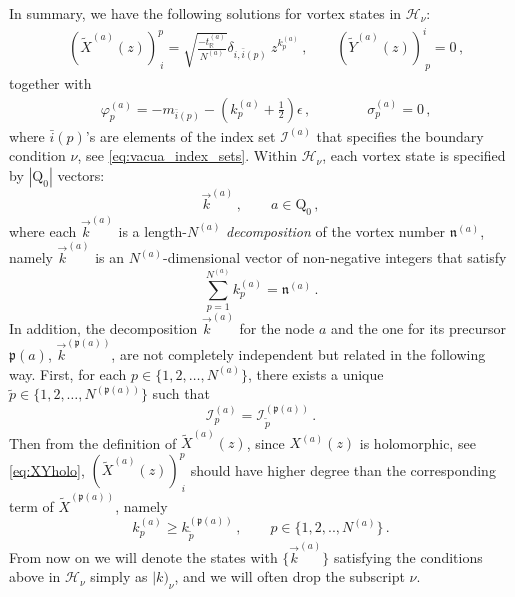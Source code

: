 \documentclass[12pt,a4paper]{article}
\newcommand{\nn}{\mathfrak{n}}
\renewcommand{\(}{\left(}
\renewcommand{\)}{\right)}
\renewcommand{\(}{\left(}
\renewcommand{\)}{\right)}
\begin{document}
\medskip

In summary, we have the following solutions for vortex states in $\mathcal{H}_\nu$:
\begin{equation}\label{eq:vortex_state}
\begin{aligned}
&\left(\tilde{X}^{(a)}(z)\right)^p_{\ i}=\sqrt{\frac{-t_{\mathbb{R}}^{(a)}}{N^{(a)}}} \delta_{i,\bar{i}(p)}\ z^{k^{(a)}_p}\,, \qquad \left(\tilde{Y}^{(a)}(z)\right)^i_{\ p}=0\,, 
\end{aligned}
\end{equation}
together with 
\begin{equation}\label{eq:vortex_state_phisigma}
\begin{aligned}
&\varphi^{(a)}_p=-m_{\bar{i}(p)}-(k^{(a)}_p+\frac{1}{2})\epsilon\,,\qquad \qquad
\sigma^{(a)}_p=0\,,
\end{aligned}
\end{equation}
where $\bar{i}(p)$'s are elements of the index set $\mathcal{I}^{(a)}$ that specifies the boundary condition $\nu$, see \eqref{eq:vacua_index_sets}.
Within $\mathcal{H}_{\nu}$, each vortex state is  specified by 
$|\mathrm{Q}_0|$ vectors:
\begin{equation}
\vec{k}^{(a)}\,,\qquad a\in \mathrm{Q}_0\,,
\end{equation}
where each $\vec{k}^{(a)}$ is a length-$N^{(a)}$ \textit{decomposition} of the vortex number $\nn^{(a)}$, namely $\vec{k}^{(a)}$ is an $N^{(a)}$-dimensional vector of non-negative integers that satisfy
\begin{equation}\label{eq:kn}
\sum_{p=1}^{N^{(a)}}k^{(a)}_p=\nn^{(a)}\,.
\end{equation}
In addition, the decomposition $\vec{k}^{(a)}$ for the node $a$ and the one for its precursor $\mathfrak{p}(a)$, $\vec{k}^{(\mathfrak{p}(a))}$,  are not completely independent but related in the following way.
First, for each $p\in\{1,2,\dots,N^{(a)}\}$, there exists a unique $\tilde{p}\in \{1,2,\dots,N^{(\mathfrak{p}(a))}\}$ such that \begin{equation}
\mathcal{I}^{(a)}_{p}=\mathcal{I}^{(\mathfrak{p}(a))}_{\tilde{p}}\,.    
\end{equation} 
Then from the definition of $\tilde{X}^{(a)}(z)$, since $X^{(a)}(z)$ is holomorphic, see \eqref{eq:XYholo}, $(\tilde{X}^{(a)}(z))^{p}_{\ i}$ should have higher degree than the corresponding term of $\tilde{X}^{(\mathfrak{p}(a))}$, namely 
\begin{equation}\label{eq:tree-codi}
k^{(a)}_{p}\geq k^{(\mathfrak{p}(a))}_{\tilde{p}}\,, \qquad p\in \{1,2,..,N^{(a)}\}\,. 
\end{equation}
From now on we will denote the states with $\{\vec{k}^{(a)}\}$ satisfying the conditions above in $\mathcal{H}_\nu$ simply as $|k)_{\nu}$, and we will often drop the subscript $\nu$.
\end{document}
